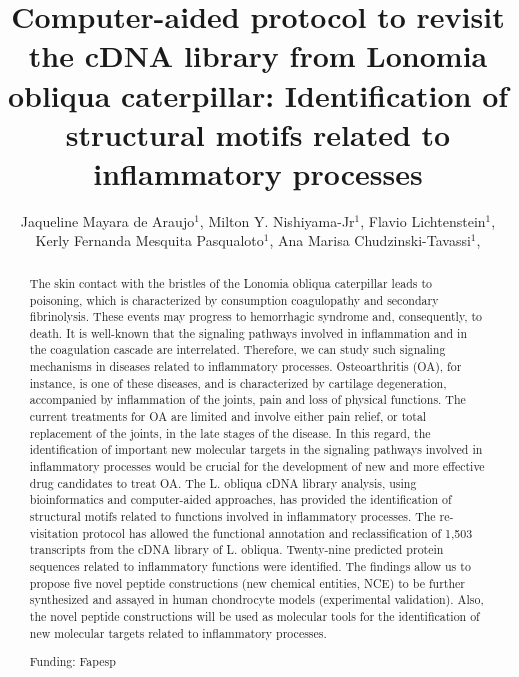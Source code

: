 \documentclass[twoside]{article}
\title{\vspace{-15mm}\fontsize{24pt}{10pt}\selectfont\textbf{ Computer-aided protocol to revisit the cDNA library from Lonomia obliqua caterpillar: Identification of structural motifs related to inflammatory processes }} %
\author{ Jaqueline Mayara de Araujo$^{1}$, Milton Y. Nishiyama-Jr$^{1}$, Flavio Lichtenstein$^{1}$, Kerly Fernanda Mesquita Pasqualoto$^{1}$, Ana Marisa Chudzinski-Tavassi$^{1}$, }
\affil{ 1 Instituto Butantan

 }
\date{}
\begin{document}
  
  
  \maketitle %
  
  
  \thispagestyle{fancy} %
  
  
  \begin{abstract}
  The skin contact with the bristles of the Lonomia obliqua  caterpillar leads to poisoning, which is characterized by consumption coagulopathy and secondary fibrinolysis. These events may progress to hemorrhagic syndrome and, consequently, to death. It is well-known that the signaling pathways involved in inflammation and in the coagulation cascade are interrelated. Therefore, we can study such signaling mechanisms in diseases related to inflammatory processes. Osteoarthritis (OA), for instance, is one of these diseases, and is characterized by cartilage degeneration, accompanied by inflammation of the joints, pain and loss of physical functions. The current treatments for OA are limited and involve either pain relief, or total replacement of the joints, in the late stages of the disease. In this regard, the identification of important new molecular targets in the signaling pathways involved in inflammatory processes would be crucial for the development of new and more effective drug candidates to treat OA. The L. obliqua cDNA library analysis, using bioinformatics and computer-aided approaches, has provided the identification of structural motifs related to functions involved in inflammatory processes. The re-visitation protocol has allowed the functional annotation and reclassification of 1,503 transcripts from the cDNA library of L. obliqua. Twenty-nine predicted protein sequences related to inflammatory functions were identified. The findings allow us to propose five novel peptide constructions (new chemical entities, NCE) to be further synthesized and assayed in human chondrocyte models (experimental validation). Also, the novel peptide constructions will be used as molecular tools for the identification of new molecular targets related to inflammatory processes.
  
  Funding: Fapesp \\ 
  \end{abstract}
  
\end{document}
